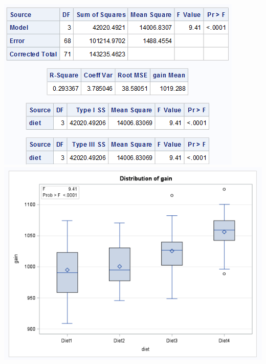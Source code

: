 \begin{flushleft}
\includegraphics[scale=1]{ChickensGLM}\\
\includegraphics[scale=0.5]{ChickensBoxPlot}
\end{flushleft}

\newpage

